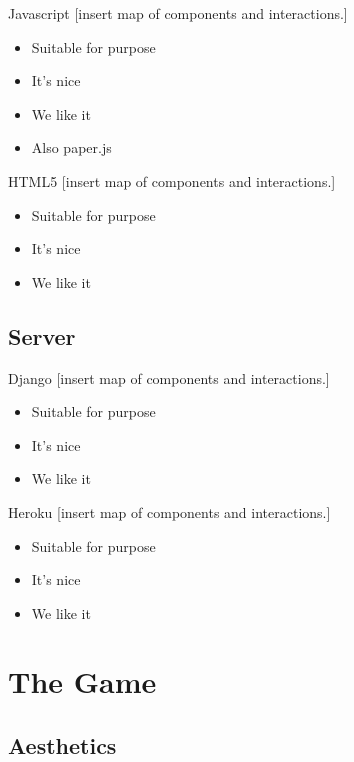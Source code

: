 \documentclass{beamer}
\begin{document}
\begin{frame}{Javascript}
  [insert map of components and interactions.]
  \begin{itemize}
    \item Suitable for purpose
    \item It's nice
    \item We like it
    \item Also paper.js
  \end{itemize}
\end{frame}

\begin{frame}{HTML5}
  [insert map of components and interactions.]
  \begin{itemize}
    \item Suitable for purpose
    \item It's nice
    \item We like it
  \end{itemize}
\end{frame}

\subsection{Server}

\begin{frame}{Django}
  [insert map of components and interactions.]
  \begin{itemize}
    \item Suitable for purpose
    \item It's nice
    \item We like it
  \end{itemize}
\end{frame}

\begin{frame}{Heroku}
  [insert map of components and interactions.]
  \begin{itemize}
    \item Suitable for purpose
    \item It's nice
    \item We like it
  \end{itemize}
\end{frame}


\section{The Game}
\subsection{Aesthetics}
\end{document}
